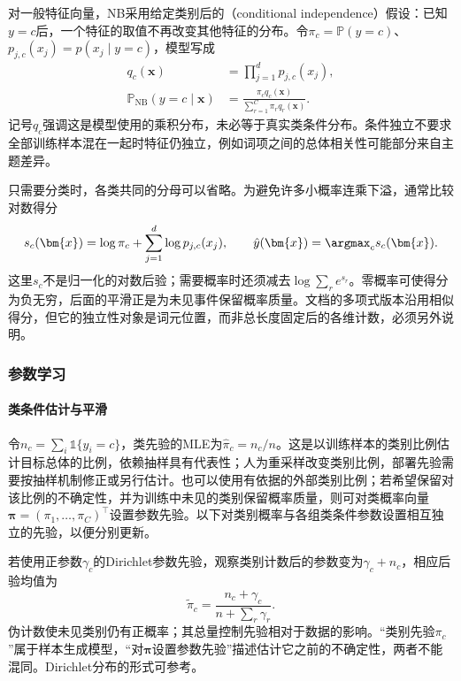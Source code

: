 对一般特征向量，NB采用给定类别后的（conditional independence）假设：已知$y=c$后，一个特征的取值不再改变其他特征的分布。令$\pi_c=\mathbb{P}(y=c)$、$p_{j,c}(x_j)=p(x_j\mid y=c)$，模型写成
\begin{equation}
  \label{eq:classification-naive-bayes-model}
  \begin{aligned}
    q_c(\bm{x})&=\prod_{j=1}^{d}p_{j,c}(x_j),\\
    \mathbb{P}_{\mathrm{NB}}(y=c\mid\bm{x})
      &=\frac{\pi_c q_c(\bm{x})}
      {\sum_{r=1}^{C}\pi_r q_r(\bm{x})}.
  \end{aligned}
\end{equation}
记号$q_c$强调这是模型使用的乘积分布，未必等于真实类条件分布。条件独立不要求全部训练样本混在一起时特征仍独立，例如词项之间的总体相关性可能部分来自主题差异。

只需要分类时，各类共同的分母可以省略。为避免许多小概率连乘下溢，通常比较对数得分
\begin{equation}
  \label{eq:classification-naive-bayes-score}
  s_c(\bm{x})
  =\log\pi_c+\sum_{j=1}^{d}\log p_{j,c}(x_j),
  \qquad
  \hat y(\bm{x})=\argmax_c s_c(\bm{x}).
\end{equation}
这里$s_c$不是归一化的对数后验；需要概率时还须减去$\log\sum_r e^{s_r}$。零概率可使得分为负无穷，后面的平滑正是为未见事件保留概率质量。文档的多项式版本沿用相似得分，但它的独立性对象是词元位置，而非总长度固定后的各维计数，必须另外说明。

\subsubsection{参数学习}
\label{sec:classification-naive-bayes-learning}

\paragraph{类条件估计与平滑}
令$n_c=\sum_i\mathbb{1}\{y_i=c\}$，类先验的MLE为$\hat\pi_c=n_c/n$。这是以训练样本的类别比例估计目标总体的比例，依赖抽样具有代表性；人为重采样改变类别比例，部署先验需要按抽样机制修正或另行估计。也可以使用有依据的外部类别比例；若希望保留对该比例的不确定性，并为训练中未见的类别保留概率质量，则可对类概率向量$\bm{\pi}=(\pi_1,\ldots,\pi_C)^{\top}$设置参数先验。以下对类别概率与各组类条件参数设置相互独立的先验，以便分别更新。

若使用正参数$\gamma_c$的Dirichlet参数先验，观察类别计数后的参数变为$\gamma_c+n_c$，相应后验均值为
\[
  \tilde\pi_c=\frac{n_c+\gamma_c}{n+\sum_r\gamma_r}.
\]
伪计数使未见类别仍有正概率；其总量控制先验相对于数据的影响。“类别先验$\pi_c$”属于样本生成模型，“对$\bm\pi$设置参数先验”描述估计它之前的不确定性，两者不能混同。Dirichlet分布的形式可参考。

